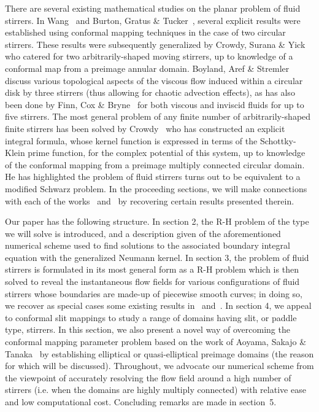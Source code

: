 \documentclass[11pt,a4paper]{article}
\begin{document}
There are several existing mathematical studies on the planar problem
of fluid stirrers. In Wang~\cite{wan} and Burton, Gratus \& Tucker~\cite{bur},
several explicit results were established using conformal mapping
techniques in the case of two circular stirrers. These results were
subsequently generalized by Crowdy, Surana \& Yick~\cite{cro-sur} who catered for
two arbitrarily-shaped moving stirrers, up to knowledge of a conformal
map from a preimage annular domain. Boyland, Aref \& Stremler~\cite{Boy00}
discuss various topological aspects of the viscous flow induced within a
circular disk by three stirrers (thus allowing for chaotic advection
effects), as has also been done by Finn, Cox \& Bryne~\cite{fin} for both
viscous and inviscid fluids for up to five stirrers. The most general
problem of any finite number of arbitrarily-shaped finite stirrers has
been solved by Crowdy~\cite{cro-str} who has constructed an explicit integral
formula, whose kernel function is expressed in terms of the
Schottky-Klein prime function, for the complex potential of this
system, up to knowledge of the conformal mapping from a preimage
multiply connected circular domain. He has highlighted the problem of
fluid stirrers turns out to be equivalent to a modified Schwarz
problem. In the proceeding sections, we will make connections with
each of the works~\cite{cro-str} and~\cite{fin} by recovering certain results
presented therein.

Our paper has the following structure. In section 2, the
R-H problem of the type we will solve is introduced, and a
description given of the aforementioned numerical scheme used to find
solutions to the associated boundary integral equation with the
generalized Neumann kernel. In section 3, the problem of fluid
stirrers is formulated in its most general form as a R-H
problem which is then solved to reveal the instantaneous flow fields
for various configurations of fluid stirrers whose boundaries are
made-up of piecewise smooth curves; in doing so, we recover as special
cases some existing results in~\cite{cro-str} and~\cite{fin}. 
In section 4, we appeal to
conformal slit mappings to study a range of domains having slit, or
paddle type, stirrers. In this section, we also present a novel way of
overcoming the conformal mapping parameter problem based on the work of Aoyama,
Sakajo \& Tanaka~\cite{Aoy-Sak-Tan13} by establishing elliptical or quasi-elliptical preimage
domains (the reason for which will be discussed). Throughout, we
advocate our numerical scheme from the viewpoint of accurately
resolving the flow field around a high number of stirrers (i.e. when
the domains are highly multiply connected) with relative ease and low
computational cost. Concluding remarks are made in section~5.
\end{document}
